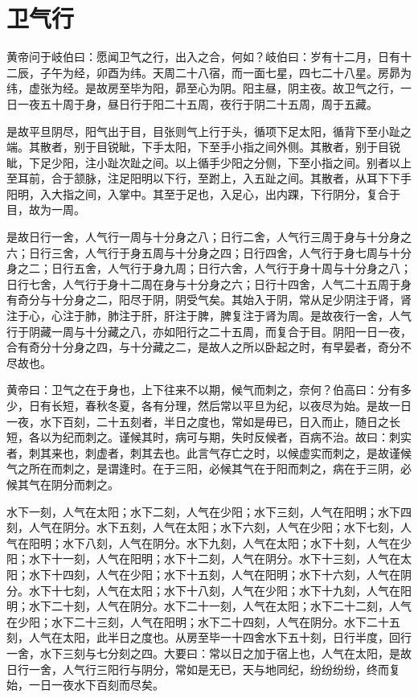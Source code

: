 \documentclass[a4paper,12pt,UTF8,twoside]{ctexbook}
\begin{document}
	\chapter{卫气行}
	
	黄帝问于岐伯曰：愿闻卫气之行，出入之合，何如？岐伯曰：岁有十二月，日有十二辰，子午为经，卯酉为纬。天周二十八宿，而一面七星，四七二十八星。房昴为纬，虚张为经。是故房至毕为阳，昴至心为阴。阳主昼，阴主夜。故卫气之行，一日一夜五十周于身，昼日行于阳二十五周，夜行于阴二十五周，周于五藏。
	
	是故平旦阴尽，阳气出于目，目张则气上行于头，循项下足太阳，循背下至小趾之端。其散者，别于目锐眦，下手太阳，下至手小指之间外侧。其散者，别于目锐眦，下足少阳，注小趾次趾之间。以上循手少阳之分侧，下至小指之间。别者以上至耳前，合于颔脉，注足阳明以下行，至跗上，入五趾之间。其散者，从耳下下手阳明，入大指之间，入掌中。其至于足也，入足心，出内踝，下行阴分，复合于目，故为一周。
	
	是故日行一舍，人气行一周与十分身之八；日行二舍，人气行三周于身与十分身之六；日行三舍，人气行于身五周与十分身之四；日行四舍，人气行于身七周与十分身之二；日行五舍，人气行于身九周；日行六舍，人气行于身十周与十分身之八；日行七舍，人气行于身十二周在身与十分身之六；日行十四舍，人气二十五周于身有奇分与十分身之二，阳尽于阴，阴受气矣。其始入于阴，常从足少阴注于肾，肾注于心，心注于肺，肺注于肝，肝注于脾，脾复注于肾为周。是故夜行一舍，人气行于阴藏一周与十分藏之八，亦如阳行之二十五周，而复合于目。阴阳一日一夜，合有奇分十分身之四，与十分藏之二，是故人之所以卧起之时，有早晏者，奇分不尽故也。
	
	黄帝曰：卫气之在于身也，上下往来不以期，候气而刺之，奈何？伯高曰：分有多少，日有长短，春秋冬夏，各有分理，然后常以平旦为纪，以夜尽为始。是故一日一夜，水下百刻，二十五刻者，半日之度也，常如是毋已，日入而止，随日之长短，各以为纪而刺之。谨候其时，病可与期，失时反候者，百病不治。故曰：刺实者，刺其来也，刺虚者，刺其去也。此言气存亡之时，以候虚实而刺之，是故谨候气之所在而刺之，是谓逢时。在于三阳，必候其气在于阳而刺之，病在于三阴，必候其气在阴分而刺之。
	
	水下一刻，人气在太阳；水下二刻，人气在少阳；水下三刻，人气在阳明；水下四刻，人气在阴分。水下五刻，人气在太阳；水下六刻，人气在少阳；水下七刻，人气在阳明；水下八刻，人气在阴分。水下九刻，人气在太阳；水下十刻，人气在少阳；水下十一刻，人气在阳明；水下十二刻，人气在阴分。水下十三刻，人气在太阳；水下十四刻，人气在少阳；水下十五刻，人气在阳明；水下十六刻，人气在阴分。水下十七刻，人气在太阳；水下十八刻，人气在少阳；水下十九刻，人气在阳明；水下二十刻，人气在阴分。水下二十一刻，人气在太阳；水下二十二刻，人气在少阳；水下二十三刻，人气在阳明；水下二十四刻，人气在阴分。水下二十五刻，人气在太阳，此半日之度也。从房至毕一十四舍水下五十刻，日行半度，回行一舍，水下三刻与七分刻之四。大要曰：常以日之加于宿上也，人气在太阳，是故日行一舍，人气行三阳行与阴分，常如是无已，天与地同纪，纷纷纷纷，终而复始，一日一夜水下百刻而尽矣。
	
\end{document}
